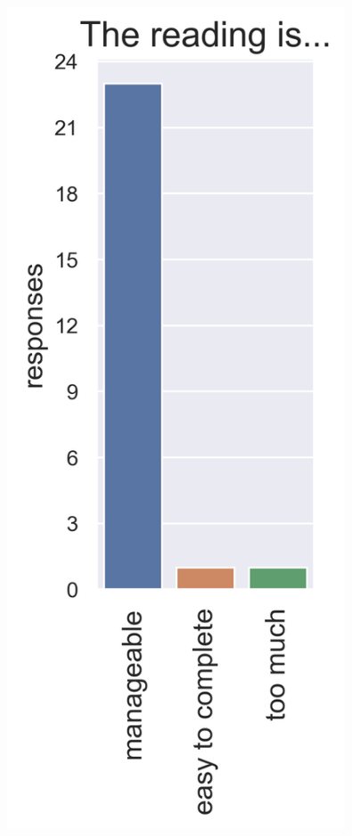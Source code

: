 \documentclass[aspectratio=169]{beamer}
\begin{document}
\begin{frame}[t]
\begin{columns}
\begin{figure}
\includegraphics[width=0.9\textwidth]{survey_readings}
\caption*{}
\end{figure}

\end{columns}
\end{frame}
\end{document}
